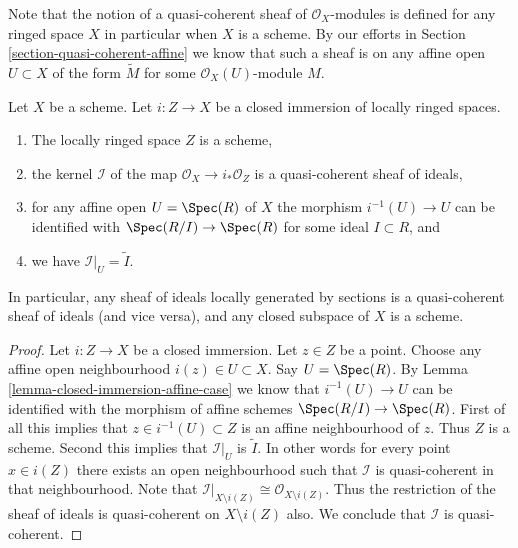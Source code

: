 \medskip\noindent
Note that the notion of a quasi-coherent sheaf of $\mathcal{O}_X$-modules
is defined for any ringed space $X$ in particular when $X$ is a scheme.
By our efforts in Section \ref{section-quasi-coherent-affine} we
know that such a sheaf is on any affine open $U \subset X$
of the form $\widetilde M$ for some $\mathcal{O}_X(U)$-module $M$.

\begin{lemma}
\label{lemma-closed-subspace-scheme}
Let $X$ be a scheme. Let $i : Z \to X$ be a closed immersion
of locally ringed spaces.
\begin{enumerate}
\item The locally ringed space $Z$ is a scheme,
\item the kernel $\mathcal{I}$ of the map
$\mathcal{O}_X \to i_*\mathcal{O}_Z$ is a quasi-coherent
sheaf of ideals,
\item for any affine open $U = \Spec(R)$ of $X$
the morphism $i^{-1}(U) \to U$ can be identified with
$\Spec(R/I) \to \Spec(R)$ for some ideal $I \subset R$, and
\item we have $\mathcal{I}|_U = \widetilde I$.
\end{enumerate}
In particular, any sheaf of ideals locally generated by sections
is a quasi-coherent sheaf of ideals (and vice versa),
and any closed subspace of $X$ is a scheme.
\end{lemma}

\begin{proof}
Let $i : Z \to X$ be a closed immersion.
Let $z \in Z$ be a point. Choose any affine open
neighbourhood $i(z) \in U \subset X$. Say $U = \Spec(R)$.
By Lemma \ref{lemma-closed-immersion-affine-case} we know
that $i^{-1}(U) \to U$ can be identified with the morphism
of affine schemes $\Spec(R/I) \to \Spec(R)$.
First of all this implies that $z \in i^{-1}(U) \subset Z$ is an
affine neighbourhood of $z$. Thus $Z$ is a scheme. Second
this implies that $\mathcal{I}|_U$ is $\widetilde I$.
In other words for every point $x \in i(Z)$ there exists an
open neighbourhood such that $\mathcal{I}$ is quasi-coherent in
that neighbourhood. Note that $\mathcal{I}|_{X \setminus i(Z)}
\cong \mathcal{O}_{X \setminus i(Z)}$. Thus the restriction
of the sheaf of ideals is quasi-coherent on $X \setminus i(Z)$
also. We conclude that $\mathcal{I}$ is quasi-coherent.
\end{proof}

